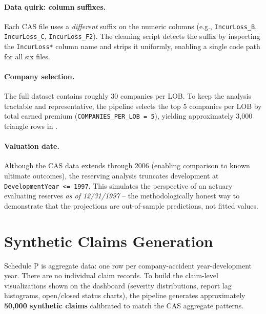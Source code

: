 \paragraph{Data quirk: column suffixes.}
Each CAS file uses a \emph{different} suffix on the numeric columns (e.g.,
\texttt{IncurLoss\_B}, \texttt{IncurLoss\_C}, \texttt{IncurLoss\_F2}).  The
cleaning script  detects the suffix by
inspecting the \texttt{IncurLoss*} column name and strips it uniformly,
enabling a single code path for all six files.

\paragraph{Company selection.}
The full dataset contains roughly 30 companies per LOB.  To keep the analysis
tractable and representative, the pipeline selects the top 5 companies per LOB
by total earned premium (\texttt{COMPANIES\_PER\_LOB = 5}), yielding
approximately 3,000 triangle rows in .

\paragraph{Valuation date.}
Although the CAS data extends through 2006 (enabling comparison to known
ultimate outcomes), the reserving analysis truncates development at
\texttt{DevelopmentYear <= 1997}.  This simulates the perspective of an
actuary evaluating reserves \emph{as of 12/31/1997} -- the methodologically
honest way to demonstrate that the projections are out-of-sample predictions,
not fitted values.

\section{Synthetic Claims Generation}
\label{sec:ins-synthetic}


Schedule P is aggregate data: one row per company-accident year-development
year.  There are no individual claim records.  To build the claim-level
visualizations shown on the dashboard (severity distributions, report lag
histograms, open/closed status charts), the pipeline generates approximately
\textbf{50,000 synthetic claims} calibrated to match the CAS aggregate
patterns.

